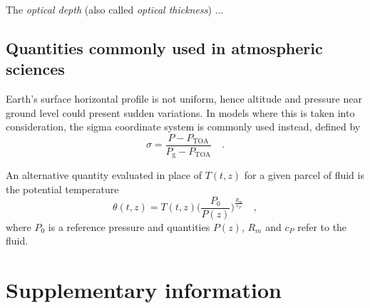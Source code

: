 \documentclass[a4paper,10pt,twocolumn,\classoptions]{article}
\newcommand{\PTOA}{P_\text{TOA}}
\begin{document}
The \emph{optical depth} (also called \emph{optical thickness}) ...



\subsection{Quantities commonly used in atmospheric sciences}
\label{sec:Quantities commonly used in atmospheric sciences}
Earth's surface horizontal profile is not uniform, hence altitude and pressure near ground level could present sudden variations. In models where this is taken into consideration, the sigma coordinate system is commonly used instead, defined by
\begin{equation}
  \label{eq:sigma_coordinate}
  \sigma = \frac{P - \PTOA}{P_\text{g} - \PTOA}
  \quad .
\end{equation}

An alternative quantity evaluated in place of $T(t,z)$ for a given parcel of fluid is the potential temperature
\begin{equation}
  \label{eq:potential_temperature}
  \theta(t,z) = T(t,z) \bigg( \frac{P_0}{P(z)} \bigg)^\frac{R_m}{c_P}
  \quad ,
\end{equation}
where $P_0$ is a reference pressure and quantities $P(z)$, $R_m$ and $c_P$ refer to the fluid.



\section{Supplementary information}
\end{document}
